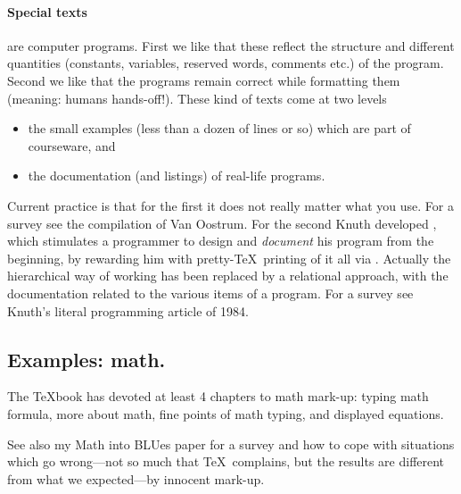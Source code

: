 \paragraph*{Special texts}are computer programs.
First we like that these
reflect the structure and different quantities (constants, variables,
reserved words, comments etc.) of the program. Second we like that the
programs remain correct while formatting them (meaning: humans hands-off!).
These kind of texts come at two levels
\begin{itemize}
\item the small examples (less than a dozen of lines or so)
      which are part of  courseware, and
\item the documentation (and listings) of real-life programs.
\end{itemize}
Current practice is that for the first it does not really matter what you use.
For a survey see the compilation of Van Oostrum.
For the second Knuth developed \WEB, which stimulates a programmer to
design and {\em document\/} his program from the beginning, by rewarding him
with pretty-\TeX\ printing of it all via \TANGLE. Actually the hierarchical
way of working has been replaced by a relational approach, with the
documentation  related to the various items of a program.
For a survey see Knuth's literal programming article of 1984.

\subsection{Examples: math.}
The \TeX book has devoted at least 4 chapters to math mark-up:
typing math formula,
more about math,
fine points of math typing, and
displayed equations.

See also my Math into BLUes paper for %
a survey and how to cope with situations which go wrong---not so much that
\TeX\ complains, but the results are different
from what we expected---by innocent mark-up.

